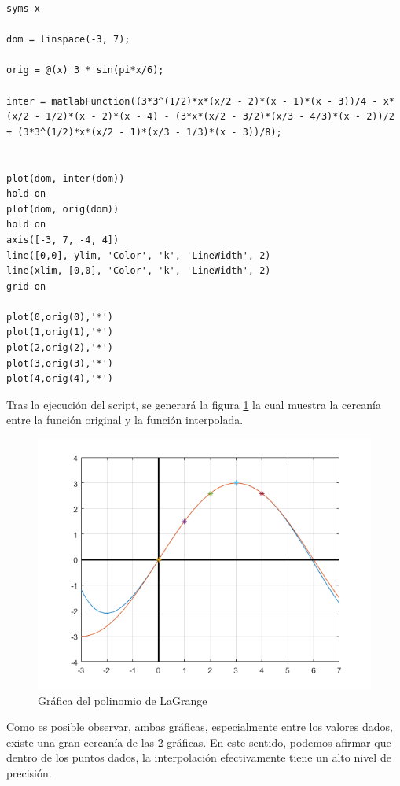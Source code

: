 \documentclass[english,notitlepage,letterpaper, 10pt]{article} %
\begin{document}
\begin{enumerate}
\begin{enumerate}
      \begin{lstlisting}
syms x

dom = linspace(-3, 7);

orig = @(x) 3 * sin(pi*x/6);

inter = matlabFunction((3*3^(1/2)*x*(x/2 - 2)*(x - 1)*(x - 3))/4 - x*(x/2 - 1/2)*(x - 2)*(x - 4) - (3*x*(x/2 - 3/2)*(x/3 - 4/3)*(x - 2))/2 + (3*3^(1/2)*x*(x/2 - 1)*(x/3 - 1/3)*(x - 3))/8);


plot(dom, inter(dom))
hold on
plot(dom, orig(dom))
hold on
axis([-3, 7, -4, 4])
line([0,0], ylim, 'Color', 'k', 'LineWidth', 2)
line(xlim, [0,0], 'Color', 'k', 'LineWidth', 2) 
grid on

plot(0,orig(0),'*')
plot(1,orig(1),'*')
plot(2,orig(2),'*')
plot(3,orig(3),'*')
plot(4,orig(4),'*')
      \end{lstlisting}

      Tras la ejecución del script, se generará la figura \ref{taco} la cual muestra la cercanía entre la función original y la función interpolada.

      \begin{center}
        \begin{figure}[H]
          \centering
          \includegraphics{Images/lagraph.png}
          \caption{Gráfica del polinomio de LaGrange}
          \label{taco}
        \end{figure}
      \end{center}

      Como es posible observar, ambas gráficas, especialmente entre los valores dados, existe una gran cercanía de las 2 gráficas. En este sentido, podemos afirmar que dentro de los puntos dados, la interpolación efectivamente tiene un alto nivel de precisión.


\end{enumerate}
\end{enumerate}
\end{document}
